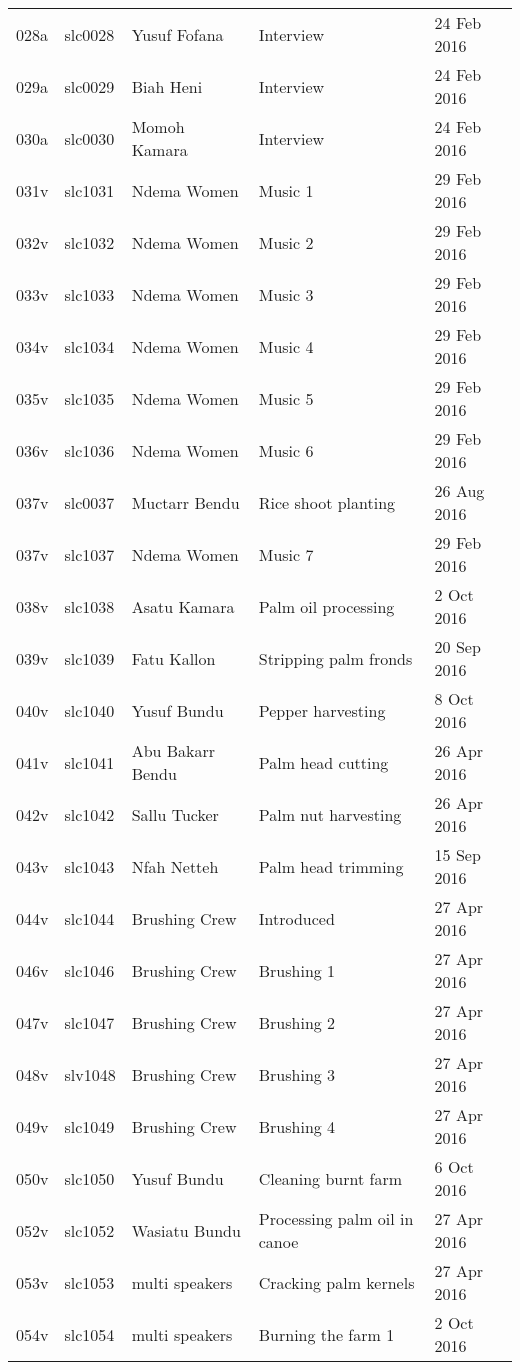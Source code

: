 \begin{xltabular}{\textwidth}{lllQl}
028a & slc0028 & Yusuf Fofana & Interview & 24 Feb 2016\\
029a & slc0029 & Biah Heni & Interview & 24 Feb 2016\\
030a & slc0030 & Momoh Kamara & Interview & 24 Feb 2016\\
031v & slc1031 & Ndema Women & Music 1 & 29 Feb 2016\\
032v & slc1032 & Ndema Women & Music 2 & 29 Feb 2016\\
033v & slc1033 & Ndema Women & Music 3 & 29 Feb 2016\\
034v & slc1034 & Ndema Women & Music 4 & 29 Feb 2016\\
035v & slc1035 & Ndema Women & Music 5 & 29 Feb 2016\\
036v & slc1036 & Ndema Women & Music 6 & 29 Feb 2016\\
037v & slc0037 & Muctarr Bendu & Rice shoot planting & 26 Aug 2016\\
037v & slc1037 & Ndema Women & Music 7 & 29 Feb 2016\\
038v & slc1038 & Asatu Kamara & Palm oil processing & 2 Oct 2016\\
039v & slc1039 & Fatu Kallon & Stripping palm fronds & 20 Sep 2016\\
040v & slc1040 & Yusuf Bundu & Pepper harvesting & 8 Oct 2016\\
041v & slc1041 & Abu Bakarr Bendu & Palm head cutting & 26 Apr 2016\\
042v & slc1042 & Sallu Tucker & Palm nut harvesting & 26 Apr 2016\\
043v & slc1043 & Nfah Netteh & Palm head trimming & 15 Sep 2016\\
044v & slc1044 & Brushing Crew & Introduced & 27 Apr 2016\\
046v & slc1046 & Brushing Crew & Brushing 1 & 27 Apr 2016\\
047v & slc1047 & Brushing Crew & Brushing 2 & 27 Apr 2016\\
048v & slv1048 & Brushing Crew & Brushing 3 & 27 Apr 2016\\
049v & slc1049 & Brushing Crew & Brushing 4 & 27 Apr 2016\\
050v & slc1050 & Yusuf Bundu & Cleaning burnt farm & 6 Oct 2016\\
052v & slc1052 & Wasiatu Bundu & Processing palm oil in canoe & 27 Apr 2016\\
053v & slc1053 & multi speakers & Cracking palm kernels & 27 Apr 2016\\
054v & slc1054 & multi speakers & Burning the farm 1 & 2 Oct 2016\\

\end{xltabular}
